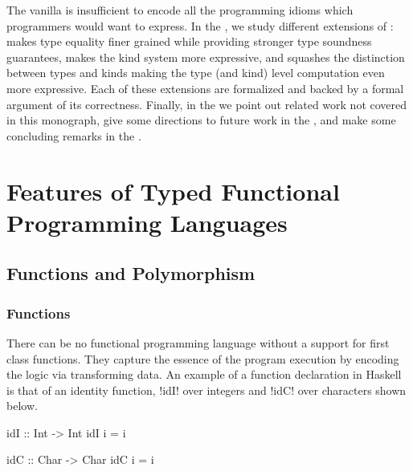 \documentclass[screen,nonacm]{acmart}
\begin{document}
The vanilla \SFC is insufficient to encode all the programming
idioms which programmers would want to express. In the
, we study different
extensions of \SFC: \SFR makes type equality finer grained while
providing stronger type soundness guarantees, \SFP makes the kind system more
expressive, and \SFK squashes the distinction between types and kinds
making the type (and kind) level computation even more
expressive. Each of these extensions are formalized and backed by a formal
argument of its correctness. Finally, in the 
we point out related work not covered in this monograph, give some directions to future
work in the , and make some concluding remarks
in the .


\section{Features of Typed Functional Programming Languages}\label{sec:language-features}%
\subsection{Functions and Polymorphism}
\subsubsection{Functions}
There can be no functional programming language without a support for first class
functions. They capture the essence of the program execution by encoding the logic via
transforming data. An example of a function declaration in Haskell is that of an identity
function, !idI! over integers and !idC! over characters shown below.

\begin{minipage}{0.5\linewidth}
\begin{CenteredBox}
\begin{code}
idI :: Int -> Int
idI i = i
\end{code}
\end{CenteredBox}
\end{minipage}%
\begin{minipage}{0.5\linewidth}
\begin{CenteredBox}
\begin{code}
idC :: Char -> Char
idC i = i
\end{code}
\end{CenteredBox}
\end{minipage}
\end{document}
